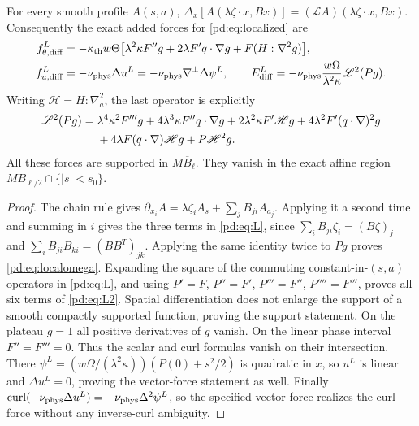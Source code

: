 \begin{pdproposition}\label{pd:prop:localized}
For every smooth profile $A(s,a)$,
$\Delta_x[A(\lambda\zeta\cdot x,Bx)]=
(\mathscr L A)(\lambda\zeta\cdot x,Bx)$.
Consequently the exact added forces for \eqref{pd:eq:localized} are
\begin{align}
 f^L_{\theta,\mathrm{diff}}
 &=-\kappa_{\rm th} w\Theta\big[
 \lambda^2\kappa F''g+2\lambda F' q\cdot\nabla g
                         +F(H:\nabla^2g)\big],\label{pd:eq:localtheta}\\
 f^L_{u,\mathrm{diff}}&=-\nu_{\rm phys}\Delta u^L
 =-\nu_{\rm phys}\nabla^\perp\Delta\psi^L,
 \qquad
 E^L_{\mathrm{diff}}=-\nu_{\rm phys}\frac{w\Omega}{\lambda^2\kappa}
       \mathscr L^2(Pg).\label{pd:eq:localomega}
\end{align}
Writing $\mathscr H=H:\nabla_a^2$, the last operator is explicitly
\begin{align}\label{pd:eq:L2}
 \mathscr L^2(Pg)={}&
 \lambda^4\kappa^2 F'''g
 +4\lambda^3\kappa F''q\cdot\nabla g
 +2\lambda^2\kappa F'\mathscr H g
 +4\lambda^2F'(q\cdot\nabla)^2g\notag\\
 &+4\lambda F(q\cdot\nabla)\mathscr H g
 +P\mathscr H^2g.
\end{align}
All these forces are supported in $M\overline B_\ell$. They vanish in
the exact affine region $M B_{\ell/2}\cap\{|s|<s_0\}$.
\end{pdproposition}
\begin{proof}
The chain rule gives
$\partial_{x_i}A=\lambda\zeta_i A_s+
\sum_jB_{ji}A_{a_j}$. Applying it a second time and summing in $i$
gives the three terms in \eqref{pd:eq:L}, since
$\sum_i B_{ji}\zeta_i=(B\zeta)_j$ and
$\sum_iB_{ji}B_{ki}=(BB^T)_{jk}$. Applying the same identity twice to
$Pg$ proves \eqref{pd:eq:localomega}. Expanding the square of the
commuting constant-in-$(s,a)$ operators in \eqref{pd:eq:L}, and using
$P'=F$, $P''=F'$, $P'''=F''$, $P''''=F'''$, proves all six terms
of \eqref{pd:eq:L2}.
Spatial differentiation does not enlarge the support of a smooth
compactly supported function, proving the support statement.
On the plateau $g=1$ all positive derivatives of $g$ vanish.
On the linear phase interval $F''=F'''=0$. Thus the scalar and curl
formulas vanish on their intersection. There
$\psi^L=(w\Omega/(\lambda^2\kappa))(P(0)+s^2/2)$ is quadratic in $x$,
so $u^L$ is linear and $\Delta u^L=0$, proving the vector-force statement
as well. Finally $\operatorname{curl}(-\nu_{\rm phys}\Delta u^L)
=-\nu_{\rm phys}\Delta^2\psi^L$, so the specified vector force realizes the
curl force without any inverse-curl ambiguity.
\end{proof}

